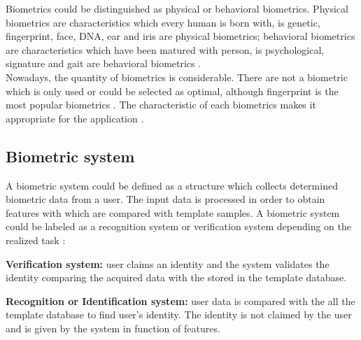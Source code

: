 Biometrics could be distinguished as physical or behavioral biometrics. Physical biometrics are characteristics which every human is born with, is genetic, fingerprint, face, DNA, ear and iris are physical biometrics; behavioral biometrics are characteristics which have been matured with person, is  psychological, signature and gait are behavioral biometrics \cite{biometrics_beha}.\\

Nowadays, the quantity of biometrics is considerable. There are not a biometric which is only used or could be selected as optimal, although fingerprint is the most popular biometrics \cite{2d_3d_face}. The characteristic of each biometrics makes it appropriate for the application \cite{Intro_biometrics}.\\%



\subsection{Biometric system}
A biometric system could be defined as a structure which collects determined biometric data from a user. The input data is processed in order to obtain features with which are compared with template samples. A biometric system could be labeled as a recognition system or verification system depending on the realized task \cite{Intro_biometrics2}:
\begin{description}[noitemsep,topsep=8pt,parsep=0pt,partopsep=20pt]
\item \textbf{Verification system:} user claims an identity and the system validates the identity comparing the acquired data with the stored in the template database.
\item \textbf{Recognition or Identification system:} user data is compared with the all the template database to find user's identity. The identity is not claimed by the user and is given by the system in function of features.
\end{description}

